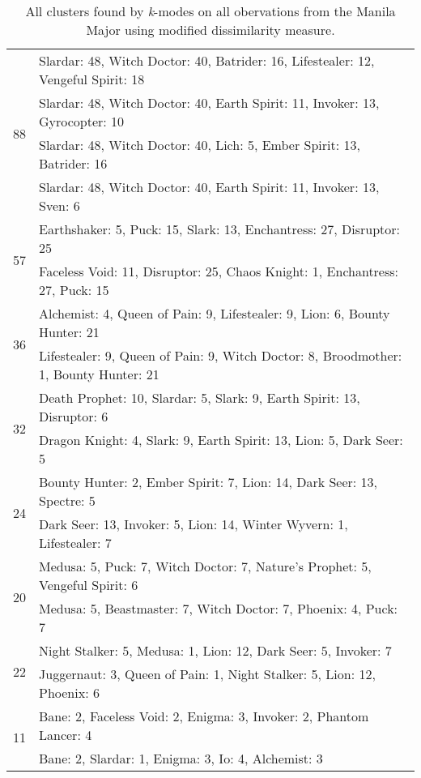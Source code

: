 \documentclass[result.tex]{subfiles}
\begin{document}
\begin{table}[H]
\begin{tabular}{ | c | p{12.5cm} | }
    \hline
    \multirow{4}{*}{88}
    & Slardar: 48, Witch Doctor: 40, Batrider: 16, Lifestealer: 12, Vengeful Spirit: 18 \\
    & Slardar: 48, Witch Doctor: 40, Earth Spirit: 11, Invoker: 13, Gyrocopter: 10 \\
    & Slardar: 48, Witch Doctor: 40, Lich: 5, Ember Spirit: 13, Batrider: 16 \\
    & Slardar: 48, Witch Doctor: 40, Earth Spirit: 11, Invoker: 13, Sven: 6 \\
    \hline
    \multirow{2}{*}{57}
    & Earthshaker: 5, Puck: 15, Slark: 13, Enchantress: 27, Disruptor: 25 \\
    & Faceless Void: 11, Disruptor: 25, Chaos Knight: 1, Enchantress: 27, Puck: 15 \\
    \hline
    \multirow{2}{*}{36}
    & Alchemist: 4, Queen of Pain: 9, Lifestealer: 9, Lion: 6, Bounty Hunter: 21 \\
    & Lifestealer: 9, Queen of Pain: 9, Witch Doctor: 8, Broodmother: 1, Bounty Hunter: 21 \\
    \hline
    \multirow{2}{*}{32}
    & Death Prophet: 10, Slardar: 5, Slark: 9, Earth Spirit: 13, Disruptor: 6 \\
    & Dragon Knight: 4, Slark: 9, Earth Spirit: 13, Lion: 5, Dark Seer: 5 \\
    \hline
    \multirow{2}{*}{24}
    & Bounty Hunter: 2, Ember Spirit: 7, Lion: 14, Dark Seer: 13, Spectre: 5 \\
    & Dark Seer: 13, Invoker: 5, Lion: 14, Winter Wyvern: 1, Lifestealer: 7 \\
    \hline
    \multirow{2}{*}{20}
    & Medusa: 5, Puck: 7, Witch Doctor: 7, Nature's Prophet: 5, Vengeful Spirit: 6 \\
    & Medusa: 5, Beastmaster: 7, Witch Doctor: 7, Phoenix: 4, Puck: 7 \\
    \hline
    \multirow{2}{*}{22}
    & Night Stalker: 5, Medusa: 1, Lion: 12, Dark Seer: 5, Invoker: 7 \\
    & Juggernaut: 3, Queen of Pain: 1, Night Stalker: 5, Lion: 12, Phoenix: 6 \\
    \hline
    \multirow{2}{*}{11}
    & Bane: 2, Faceless Void: 2, Enigma: 3, Invoker: 2, Phantom Lancer: 4 \\
    & Bane: 2, Slardar: 1, Enigma: 3, Io: 4, Alchemist: 3 \\
    \hline
  \end{tabular}
   \caption{All clusters found by \textit{k}-modes on all obervations from the Manila Major using modified dissimilarity measure.}
  \label{tab:cl_app_manila_kmodes_mod}
\end{table}
\end{document}
